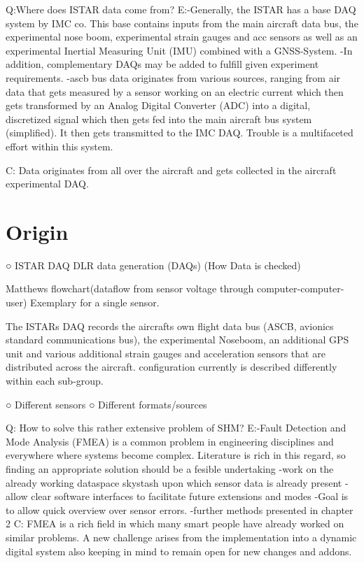 Q:Where does ISTAR data come from?
E:-Generally, the ISTAR has a base DAQ system by IMC co. This base contains inputs from the main aircraft data bus, the experimental nose boom, experimental strain gauges and acc sensors as well as an experimental Inertial Measuring Unit (IMU) combined with a GNSS-System.
-In addition, complementary DAQs may be added to fulfill given experiment requirements.
-ascb bus data originates from various sources, ranging from air data that gets measured by a sensor working on an electric current which then gets transformed by an Analog Digital Converter (ADC) into a digital, discretized signal which then gets fed into the main aircraft bus system (simplified). It then gets transmitted to the IMC DAQ. Trouble is a multifaceted effort within this system.

C: Data originates from all over the aircraft and gets collected in the aircraft experimental DAQ.

\section{Origin}
		○ ISTAR DAQ
		DLR data generation (DAQs) (How Data is checked)

Matthews flowchart(dataflow from sensor voltage through computer-computer-user)
Exemplary for a single sensor.

The ISTARs DAQ records the aircrafts own flight data bus (ASCB, avionics standard communications bus), the experimental Noseboom, an additional GPS unit and various additional strain gauges and acceleration sensors that are distributed across the aircraft. configuration currently is described differently within each sub-group.


		○ Different sensors
		○ Different formats/sources



Q: How to solve this rather extensive problem of SHM?
E:-Fault Detection and Mode Analysis (FMEA) is a common problem in engineering disciplines and everywhere where systems become complex. Literature is rich in this regard, so finding an appropriate solution should be a fesible undertaking
-work on the already working dataspace skystash upon which sensor data is already present
-allow clear software interfaces to facilitate future extensions and modes
-Goal is to allow quick overview over sensor errors.
-further methods presented in chapter 2
C: FMEA is a rich field in which many smart people have already worked on similar problems. A new challenge arises from the implementation into a dynamic digital system also keeping in mind to remain open for new changes and addons.

